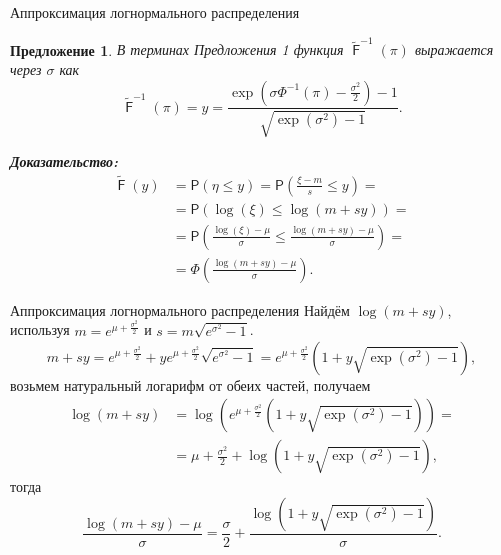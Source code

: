 \documentclass[ucs, notheorems, handout]{beamer}
\newtheorem{proposition}[theorem]{Предложение}
\DeclareMathOperator{\F}{\mathsf{F}}
\begin{document}
	\begin{frame}{Аппроксимация логнормального распределения}
		\begin{proposition}\label{pr2}
			В терминах Предложения 1 функция $\tilde{\F}^{-1}(\pi)$ выражается через $\sigma$ как
			\begin{equation*}
				\displaystyle{\tilde{\F}^{-1}(\pi) = y = \frac{\exp(\sigma\Phi^{-1}(\pi) - \frac{\sigma^{2} }{2})-1}{\sqrt{\exp(\sigma ^{2})-1}}}.
			\end{equation*}\label{12}
		\end{proposition}
		\textbf{\textit{Доказательство:}}
			\begin{align*}
			\tilde{\F}(y) &= \mathsf{P}\left(\eta\leq y \right) = \mathsf{P}\left(\frac{\xi-m}{s} \leq y \right)= \\
			&=\mathsf{P}(\log(\xi)\leq \log(m+sy))=\\
			&=\mathsf{P}\left( \frac{\log(\xi)-\mu}{\sigma}\leq \frac{\log(m+sy)-\mu}{\sigma} \right) =\\
			&=\Phi \left(\frac{\log(m+sy) - \mu}{\sigma}\right).
		\end{align*}
	\end{frame}

\begin{frame}{Аппроксимация логнормального распределения}
	Найдём $\log(m+sy)$, используя $m = e^{\mu +\frac{\sigma ^{2}}{2}}$ и $s = m\sqrt{e^{\sigma ^{2}}-1}$.
	\begin{equation*}
		m+sy = e^{\mu +\frac{\sigma ^{2}}{2}} + ye^{\mu +\frac{\sigma ^{2}}{2}}\sqrt{e^{\sigma ^{2}}-1} = e^{\mu +\frac{\sigma ^{2}}{2}}(1+y\sqrt{\exp(\sigma ^{2})-1}),
	\end{equation*}
	возьмем натуральный логарифм от обеих частей, получаем
	\begin{align*}
		\log(m+sy) &= \log(e^{\mu +\frac{\sigma ^{2}}{2}}(1+y\sqrt{\exp(\sigma ^{2})-1})) =\\
		&=\mu +\frac{\sigma ^{2}}{2} + \log(1+y\sqrt{\exp(\sigma ^{2})-1}),
	\end{align*}
	тогда
	\begin{equation*}
		\displaystyle{\frac{\log(m+sy)-\mu }{\sigma } = \frac{\sigma }{2} + \frac{\log(1+y\sqrt{\exp(\sigma ^{2})-1})}{\sigma}}.
	\end{equation*}
\end{frame}
\end{document}
